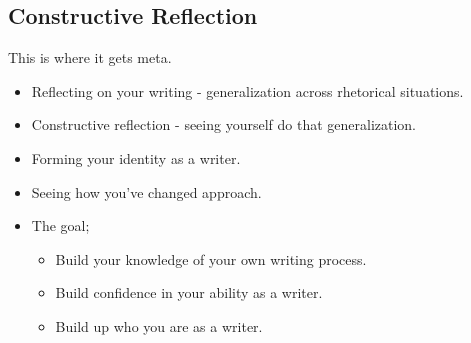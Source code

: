 \documentclass[12pt]{article}
\begin{document}
    \subsection{Constructive Reflection}
    This is where it gets meta.
    \begin{itemize}
        \item Reflecting on your writing - generalization across rhetorical situations.
        \item Constructive reflection - seeing yourself do that generalization.
	\item Forming your identity as a writer.
	\item Seeing how you've changed approach.
	\item The goal;
	\begin{itemize}
	    \item Build your knowledge of your own writing process.
	    \item Build confidence in your ability as a writer.
	    \item Build up who you are as a writer.
        \end{itemize}
    \end{itemize}
\end{document}
